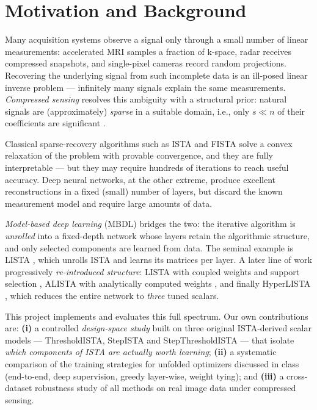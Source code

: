 \documentclass[12pt,a4paper]{article}
\begin{document}
\tableofcontents
\newpage

\section{Motivation and Background}
\label{sec:motivation}

Many acquisition systems observe a signal only through a small number of linear measurements: accelerated MRI samples a fraction of k-space, radar receives compressed snapshots, and single-pixel cameras record random projections. Recovering the underlying signal from such incomplete data is an ill-posed linear inverse problem --- infinitely many signals explain the same measurements. \emph{Compressed sensing} resolves this ambiguity with a structural prior: natural signals are (approximately) \emph{sparse} in a suitable domain, i.e., only $s \ll n$ of their coefficients are significant \cite{donoho2006cs}.

Classical sparse-recovery algorithms such as ISTA and FISTA \cite{beck2009fista} solve a convex relaxation of the problem with provable convergence, and they are fully interpretable --- but they may require hundreds of iterations to reach useful accuracy. Deep neural networks, at the other extreme, produce excellent reconstructions in a fixed (small) number of layers, but discard the known measurement model and require large amounts of data.

\emph{Model-based deep learning} (MBDL) \cite{shlezinger2023mbdl} bridges the two: the iterative algorithm is \emph{unrolled} into a fixed-depth network whose layers retain the algorithmic structure, and only selected components are learned from data. The seminal example is LISTA \cite{gregor2010lista}, which unrolls ISTA and learns its matrices per layer. A later line of work progressively \emph{re-introduced structure}: LISTA with coupled weights and support selection \cite{chen2018lista}, ALISTA with analytically computed weights \cite{liu2019alista}, and finally HyperLISTA \cite{chen2021hyperlista}, which reduces the entire network to \emph{three} tuned scalars.

This project implements and evaluates this full spectrum. Our own contributions are: \textbf{(i)} a controlled \emph{design-space study} built on three original ISTA-derived scalar models --- ThresholdISTA, StepISTA and StepThresholdISTA --- that isolate \emph{which components of ISTA are actually worth learning}; \textbf{(ii)} a systematic comparison of the training strategies for unfolded optimizers discussed in class (end-to-end, deep supervision, greedy layer-wise, weight tying); and \textbf{(iii)} a cross-dataset robustness study of all methods on real image data under compressed sensing.
\end{document}
